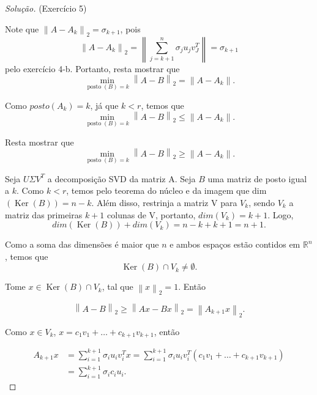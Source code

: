 \documentclass[a4paper,10pt]{article}
\newenvironment{solution}
  {\begin{proof}[Solução]}
  {\end{proof}}
\newcommand{\norm}[1]{\left\lVert#1\right\rVert}
\DeclareMathOperator{\Ker}{Ker}
\DeclareMathOperator{\posto}{posto}
\begin{document}
  \begin{solution}{(Exercício 5)}

    Note que $\norm{A - A_k}_2 = \sigma_{k+1}$, pois
    \begin{equation*}
      \norm{A - A_k}_2 = \norm{\sum_{j=k+1}^{n}\sigma_ju_jv_J^T} = \sigma_{k+1}
    \end{equation*}
    pelo exercício 4-b. Portanto, resta mostrar que
    \begin{equation*}
        \min_{\posto(B) = k} \norm{A-B}_2 = \norm{A-A_k}.
    \end{equation*}

    Como $posto(A_k) = k$, já que $k<r$, temos que
    \begin{equation*}
      \min_{\posto(B) = k} \norm{A-B}_2 \leq \norm{A-A_k}.
    \end{equation*}

    Resta mostrar que
    \begin{equation*}
      \min_{\posto(B) = k} \norm{A-B}_2 \geq \norm{A-A_k}.
    \end{equation*}

    Seja $U\Sigma V^T$ a decomposição SVD da matriz A. Seja $B$ uma matriz de posto
    igual a $k$. Como $k<r$, temos pelo teorema do núcleo e da imagem que
    dim$(\Ker(B)) = n-k$. Além disso, restrinja a matriz V para $V_k$,
    sendo $V_k$ a matriz das primeiras $k+1$  colunas
    de V, portanto, $ dim(V_k) = k+1 $. Logo,
    \begin{equation*}
      dim(\Ker(B)) + dim(V_k) = n-k + k + 1 = n+1.
    \end{equation*}

    Como a soma das dimensões é maior que $n$ e ambos espaços estão contidos em
    $\mathbb{R}^n$, temos que
    \begin{equation*}
      \Ker(B) \cap V_k \neq \emptyset.
    \end{equation*}

    Tome $x \in \Ker(B) \cap V_k$, tal que $\norm{x}_2 = 1$. Então

    \begin{equation*}
      \norm{A-B}_2 \geq \norm{Ax-Bx}_2 = \norm{A_{k+1}x}_2.
    \end{equation*}

    Como $x \in V_k$, $x = c_1v_1 + \dots + c_{k+1}v_{k+1}$, então

    \begin{equation*}
      \begin{split}
        A_{k+1}x &= \sum_{i=1}^{k+1}\sigma_iu_iv_i^Tx = \sum_{i=1}^{k+1}\sigma_iu_iv_i^T
      (c_1v_1 + \dots + c_{k+1}v_{k+1}) \\
        &= \sum_{i=1}^{k+1}\sigma_ic_iu_i.
      \end{split}
    \end{equation*}


\end{solution}
\end{document}
